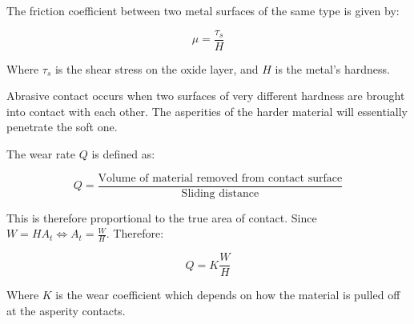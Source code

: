 \documentclass{article}
\begin{document}
\begin{theorem}
    The friction coefficient between two metal surfaces of the same type is given by:

    \[ \mu = \frac{\tau_s}{H} \]

    Where $\tau_s$ is the shear stress on the oxide layer, and $H$ is the metal's hardness.
\end{theorem}

\begin{definition}
    Abrasive contact occurs when two surfaces of very different hardness are brought into contact with each other. The asperities of the harder material will essentially penetrate the soft one.
\end{definition}

\begin{definition}[Wear]
    The wear rate $Q$ is defined as:

    \[ Q = \frac{\text{Volume of material removed from contact surface}}{\text{Sliding distance}} \]

    This is therefore proportional to the true area of contact. Since $W = HA_t \iff A_t = \frac{W}{H}$. Therefore:

    \[ Q = K\frac{W}{H} \]

    Where $K$ is the wear coefficient which depends on how the material is pulled off at the asperity contacts.
\end{definition}
\end{document}
